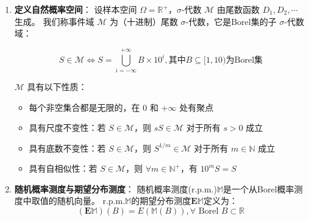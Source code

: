 \documentclass{ctexart} %
\begin{document}
\begin{enumerate}
    \item \textbf{定义自然概率空间}：
    设样本空间 $\Omega = \mathbb{R}^+$，$\sigma$-代数 $\mathscr{M}$ 由尾数函数 ${D_1, D_2, \cdots}$ 生成。
    我们称事件域 $\mathscr{M}$ 为（十进制）尾数 $\sigma$-代数，它是Borel集的子 $\sigma$-代数域：
    
    \begin{equation}
        S\in\mathscr{M} \Leftrightarrow S=\bigcup_{i=-\infty}^{+\infty}B\times10^i,
        \text{其中} B \subseteq [1,10) \text{为Borel集}
    \end{equation}

    $\mathscr{M}$ 具有以下性质：
    \begin{itemize}
        \item 每个非空集合都是无限的，在 $0$ 和 $+\infty$ 处有聚点
        \item 具有尺度不变性：若 $S\in \mathscr{M}$，则 $sS\in \mathscr{M}$ 对于所有 $s>0$ 成立
        \item 具有底数不变性：若 $S\in \mathscr{M}$，则 $S^{1/m}\in \mathscr{M}$ 对于所有 $m\in \mathbb{N}$ 成立
        \item 具有自相似性：若 $S\in \mathscr{M}$，则 $\forall m\in \mathbb{N}^+$，有 $10^{m}S=S$
    \end{itemize}

    \item \textbf{随机概率测度与期望分布测度}：
    随机概率测度(r.p.m.)$\mathbb{M}$是一个从Borel概率测度中取值的随机向量\cite{Kallenberg}。
    r.p.m.$\mathbb{M}$的期望分布测度$\mathbf{E}\mathbb{M}$定义为：
    \begin{equation}
        (\mathbf{E}\mathbb{M})(B) = E(\mathbb{M}(B)), \forall \text{ Borel } B\subset \mathbb{R}
    \end{equation}


\end{enumerate}
\end{document}
